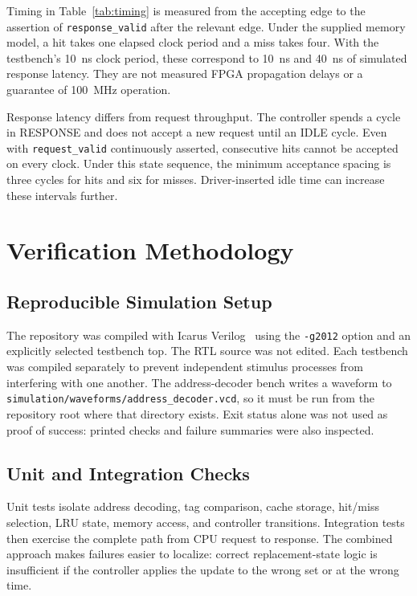 \documentclass[conference]{IEEEtran}
\begin{document}
Timing in Table~\ref{tab:timing} is measured from the accepting edge to
the assertion of \texttt{response\_valid} after the relevant edge. Under
the supplied memory model, a hit takes one elapsed clock period and a
miss takes four. With the testbench's 10~ns clock period, these
correspond to 10~ns and 40~ns of simulated response latency. They are
not measured FPGA propagation delays or a guarantee of 100~MHz
operation.

Response latency differs from request throughput. The controller spends
a cycle in RESPONSE and does not accept a new request until an IDLE
cycle. Even with \texttt{request\_valid} continuously asserted,
consecutive hits cannot be accepted on every clock. Under this state
sequence, the minimum acceptance spacing is three cycles for hits and
six for misses. Driver-inserted idle time can increase these intervals
further.

\section{Verification Methodology}

\subsection{Reproducible Simulation Setup}

The repository was compiled with Icarus Verilog~\cite{icarus} using the
\texttt{-g2012} option and an explicitly selected testbench top. The
RTL source was not edited. Each testbench was compiled separately to
prevent independent stimulus processes from interfering with one
another. The address-decoder bench writes a waveform to
\texttt{simulation/waveforms/address\_decoder.vcd}, so it must be run
from the repository root where that directory exists. Exit status alone
was not used as proof of success: printed checks and failure summaries
were also inspected.

\subsection{Unit and Integration Checks}

Unit tests isolate address decoding, tag comparison, cache storage,
hit/miss selection, LRU state, memory access, and controller
transitions. Integration tests then exercise the complete path from CPU
request to response. The combined approach makes failures easier to
localize: correct replacement-state logic is insufficient if the
controller applies the update to the wrong set or at the wrong time.
\end{document}

